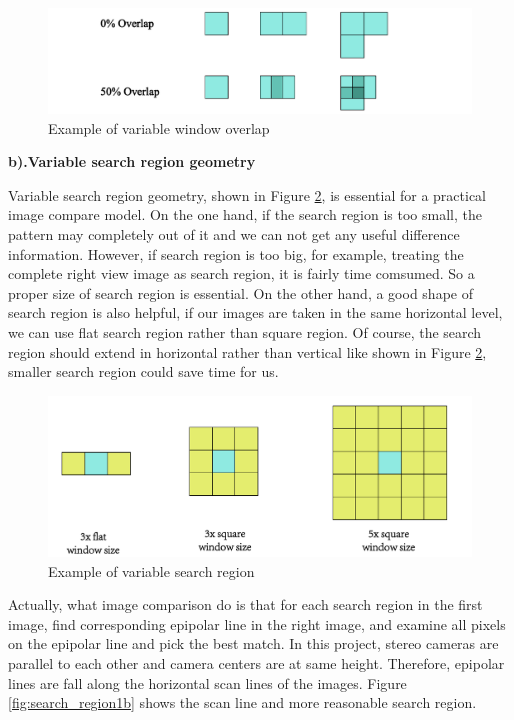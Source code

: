 \begin{figure}[h!]
	\centering
	\includegraphics[width=0.8\linewidth]{figures/part2/window_overlap}
	\caption{Example of variable window overlap}
	\label{fig:window_overlap}
\end{figure}

\textbf{b).Variable search region geometry}

Variable search region geometry, shown in Figure \ref{fig:search_region}, is essential for a practical image compare model. On the one hand, if the search region is too small, the pattern may completely out of it and we can not get any useful difference information. However, if search region is too big, for example, treating the complete right view image as search region, it is fairly time comsumed. So a proper size of search region is essential. On the other hand, a good shape of search region is also helpful, if our images are taken in the same horizontal level, we can use flat search region rather than square region. Of course, the search region should extend in horizontal rather than vertical like shown in Figure \ref{fig:search_region}, smaller search region could save time for us.

\begin{figure}[h!]
	\centering
	\includegraphics[width=0.8\linewidth]{figures/part2/search_region}
	\caption{Example of variable search region}
	\label{fig:search_region}
\end{figure}

Actually, what image comparison do is that for each search region in the first image, find corresponding epipolar line in the right image, and examine all pixels on the epipolar line and pick the best match. In this project, stereo cameras are parallel to each other and camera centers are at same height. Therefore, epipolar lines are fall along the horizontal scan lines of the images. Figure \ref{fig:search_region1b} shows the scan line and more reasonable search region.


